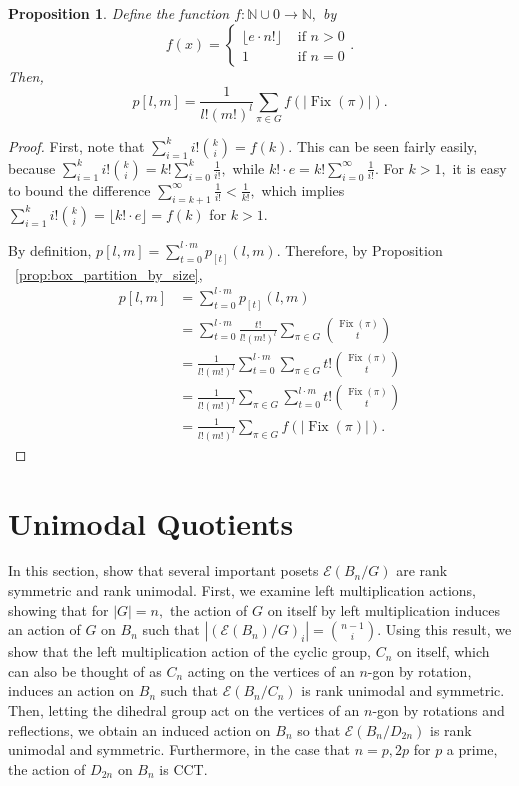 \documentclass[10 pt]{amsart}
\theoremstyle{plain}
\newtheorem{prop}[thm]{Proposition}
\theoremstyle{definition}
\theoremstyle{remark}
\numberwithin{equation}{section}
\newcommand\BN{{\mathbb N}}
\def\Fix{\operatorname{Fix}}
\begin{document}
\begin{prop}
\label{prop:all_box_partitions}
Define the function $f:\BN \cup 0 \rightarrow \BN,$ by $$f(x) = \begin{cases} \lfloor e\cdot n!\rfloor &\text{ if } n > 0 \\ 1 &\text{ if } n = 0\end{cases}.$$
Then, $$p[l,m] = \frac 1 {l!(m!)^l}\sum_{\pi \in G} f(|\Fix(\pi)|).$$
\end{prop}
\begin{proof}
First, note that $\sum_{i=1}^k i! \binom k i = f(k).$ This can be seen fairly easily, because $\sum_{i=1}^k i! \binom k i = k!\sum_{i=0}^k \frac 1 {i!},$ while $k! \cdot e = k!\sum_{i=0}^\infty \frac 1 {i!}.$ For $k > 1,$ it is easy to bound the difference $\sum_{i=k+1}^\infty \frac 1 {i!} < \frac 1 {k!},$ which implies   $\sum_{i=1}^k i! \binom k i  = \lfloor k! \cdot e \rfloor = f(k)$ for $k > 1.$

By definition, $p[l,m] = \sum_{t = 0}^{l\cdot m} p_{[t]}(l,m)$. Therefore, by Proposition ~\ref{prop:box_partition_by_size},
\begin{align*}
p[l,m] &= \sum_{t = 0}^{l\cdot m} p_{[t]}(l,m)\\
&=\sum_{t = 0}^{l\cdot m}\frac {t!}{l!(m!)^l}\sum_{\pi \in G} \binom {\Fix(\pi)} t\\
&= \frac {1}{l!(m!)^l}\sum_{t = 0}^{l\cdot m}\sum_{\pi \in G} t!\binom {\Fix(\pi)} t\\
&=  \frac {1}{l!(m!)^l}\sum_{\pi \in G}\sum_{t = 0}^{l\cdot m} t!\binom {\Fix(\pi)} t\\
&= \frac {1}{l!(m!)^l}\sum_{\pi \in G} f(|\Fix(\pi)|).
\end{align*}
\end{proof}




\section{Unimodal Quotients}
\label{sec:unimodal}

In this section, show that several important posets $\mathcal E(B_n/G)$ are rank symmetric and rank unimodal. First, we examine left multiplication actions, showing that for $|G| = n,$ the action of $G$ on itself by left multiplication induces an action of $G$ on $B_n$ such that $|(\mathcal E(B_n)/G)_i| = \binom {n-1} i.$ Using this result, we show that the left multiplication action of the cyclic group, $C_n$ on itself, which can also be thought of as $C_n$ acting on the vertices of an $n$-gon by rotation, induces an action on $B_n$ such that $\mathcal E(B_n/C_n)$ is rank unimodal and symmetric. Then, letting the dihedral group act on the vertices of an $n$-gon by rotations and reflections, we obtain an induced action on $B_n$ so that $\mathcal E(B_n/D_{2n})$ is rank unimodal and symmetric. Furthermore, in the case that $n = p,2p$ for $p$ a prime, the action of $D_{2n}$ on $B_n$ is CCT.
\end{document}
